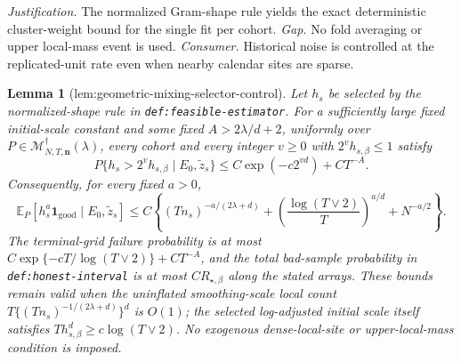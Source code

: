 \documentclass{article}
\newtheorem{lemma}{Lemma}
\begin{document}
\par\smallskip\noindent \textit{Justification.} The normalized Gram-shape rule yields the exact deterministic cluster-weight bound for the single fit per cohort. \textit{Gap.} No fold averaging or upper local-mass event is used. \textit{Consumer.} Historical noise is controlled at the replicated-unit rate even when nearby calendar sites are sparse.

\begin{lemma}[lem:geometric-mixing-selector-control]\label{lem:geometric-mixing-selector-control}
Let \(h_s\) be selected by the normalized-shape rule in \texttt{def:feasible-estimator}.  For a sufficiently large fixed initial-scale constant and some fixed \(A>2\lambda/d+2\), uniformly over \(P\in\mathcal M_{N,T,\mathbf n}^{\dagger}(\lambda)\), every cohort and every integer \(v\ge0\) with \(2^vh_{s,\beta}\le1\) satisfy
\[
P\{h_s>2^vh_{s,\beta}\mid E_0,\widetilde z_s\}
\le C\exp(-c2^{vd})+CT^{-A}.
\]
Consequently, for every fixed \(a>0\),
\[
\mathbb E_P[h_s^a\mathbf1_{\mathrm{good}}\mid E_0,\widetilde z_s]
\le C\left\{(Tn_s)^{-a/(2\lambda+d)}
+\left(\frac{\log(T\vee2)}T\right)^{a/d}
+N^{-a/2}\right\}.
\]
The terminal-grid failure probability is at most \(C\exp\{-cT/\log(T\vee2)\}+CT^{-A}\), and the total bad-sample probability in \texttt{def:honest-interval} is at most \(CR_{\star,\beta}\) along the stated arrays.  These bounds remain valid when the uninflated smoothing-scale local count \(T\{(Tn_s)^{-1/(2\lambda+d)}\}^d\) is \(O(1)\); the selected log-adjusted initial scale itself satisfies \(Th_{s,\beta}^d\ge c\log(T\vee2)\).  No exogenous dense-local-site or upper-local-mass condition is imposed.
\end{lemma}
\end{document}
